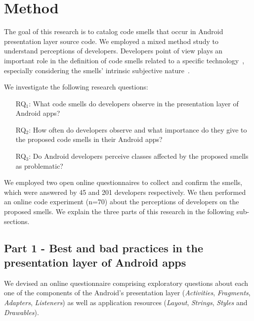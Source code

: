 \section{Method}

The goal of this research is to catalog code smells that occur in Android presentation layer source code. We employed a mixed method study to understand perceptions of developers. Developers point of view plays an important role in the definition of code smells related to a specific technology~\cite{arcverde2011understanding, Palomba_Do_2014, yamashita2013developers}, especially considering the smells' intrinsic subjective nature~\cite{JavascriptSmells, JavaQADetectingSmells:02}.

We investigate the following research questions:

\newcommand{\rqone}{What code smells do developers observe in the presentation layer of Android apps?}
\newcommand{\rqtwo}{How often do developers observe and what importance do they give to the proposed code smells in their Android apps?}
\newcommand{\rqthree}{Do Android developers perceive classes affected by the proposed smells as problematic?}

\begin{itemize}
    \item[RQ$_1$:] \rqone

    \item[RQ$_2$:] \rqtwo

    \item[RQ$_3$:] \rqthree
\end{itemize}

We employed two open online questionnaires to collect and confirm the smells, which were answered by 45 and 201 developers respectively. We then performed an online code experiment (n=70) about the perceptions of developers on the proposed smells. 
We explain the three parts of this research in the following sub-sections.

\subsection{Part 1 - Best and bad practices in the presentation layer of Android apps}
\label{etapa-1}

We devised an online questionnaire comprising exploratory questions
about each one of the components of the Android's presentation layer 
(\textit{Activities}, \textit{Fragments}, \textit{Adapters}, \textit{Listeners}) 
as well as application resources (\textit{Layout}, \textit{Strings}, 
\textit{Styles} and \textit{Drawables}). 

